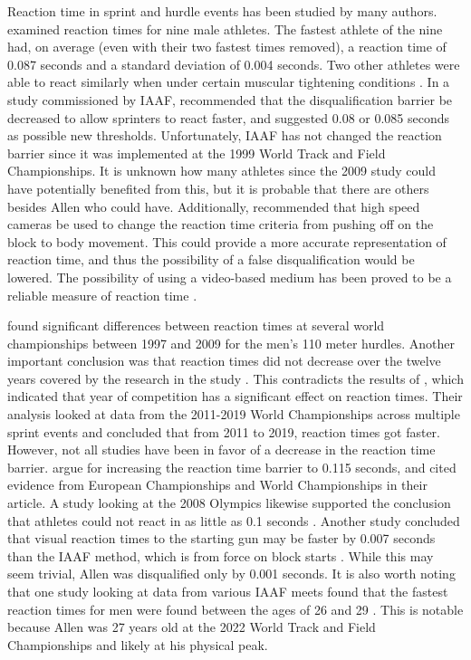 \documentclass[12pt, letterpaper, titlepage]{article}
\begin{document}
Reaction time in sprint and hurdle events has been studied by many authors.
\citet{pain2007sprint} examined reaction times for nine male athletes.  The
fastest athlete of the nine had, on average (even with their two fastest times 
removed), a reaction time of 0.087 seconds and a standard deviation of 0.004
seconds.  Two other athletes were able to react similarly when under certain
muscular tightening conditions \citep{pain2007sprint}. 
In a study commissioned by IAAF,
\citet{komi2009iaaf} recommended that the disqualification 
barrier be decreased to allow sprinters to
react faster, and suggested 0.08 or 0.085 seconds as possible new thresholds.
Unfortunately, IAAF has not changed the reaction barrier since it was
implemented at the 1999 World Track and Field Championships.
It is unknown how many athletes since the 2009 study could have potentially
benefited from this, but it is probable that there are others besides Allen who
could have. Additionally,
\citet{komi2009iaaf} recommended that high speed cameras be used to
change the reaction time criteria from pushing off on the block to body
movement. This could provide a more accurate representation of reaction time, 
and thus the possibility of a false disqualification would be lowered.
The possibility of using a video-based medium has been proved to be a reliable
measure of reaction time \citep{mudric2015evaluation}.


\citet{pilianidis2012start} found
significant differences between reaction times at several world championships
between 1997 and 2009 for the men's 110 meter hurdles.  Another important
conclusion was that reaction times did not decrease over the twelve years
covered by the research in the study \citep{pilianidis2012start}. This 
contradicts the results of \citet{zhang2021correlation}, which indicated that 
year of competition has a significant effect on reaction times.  Their
analysis looked at data from the 2011-2019 World Championships across multiple
sprint events and concluded that from 2011 to 2019, reaction times got
faster. However, not all studies have been in favor of a decrease in the
reaction time barrier. \citet*{brosnan2017effects} argue for increasing 
the reaction time barrier to 0.115 seconds, and cited evidence from European 
Championships and World Championships in their article.  A study looking 
at the 2008 Olympics likewise supported the conclusion that athletes could not
react in as little as 0.1 seconds \citep{lipps2011implications}.  Another study
concluded that visual reaction times to the starting gun may be faster by 0.007
seconds than the IAAF method, which is from force on block starts 
\citep{holmes2018method}.  While this may seem trivial, Allen was disqualified
only by 0.001 seconds. It is also worth noting that one study looking at data 
from various IAAF meets found that the fastest reaction times for men were found
between the ages of 26 and 29 \citep{tonnessen2013reaction}.  This is notable 
because Allen was 27 years old at the 2022 World Track and Field Championships 
and likely at his physical peak.
\end{document}
